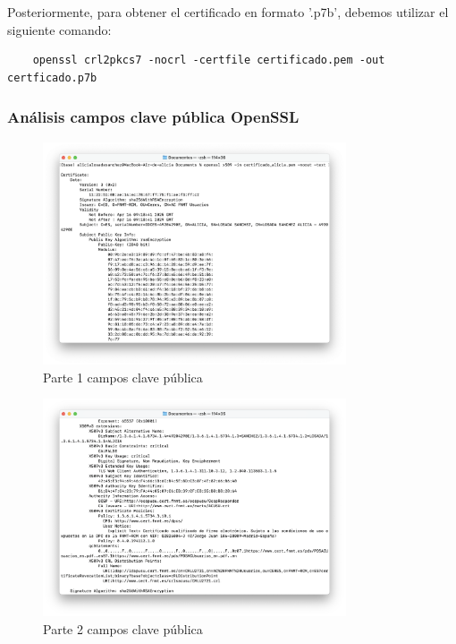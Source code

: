 Posteriormente, para obtener el certificado en formato '.p7b', debemos utilizar el siguiente comando:

\begin{verbatim}
    openssl crl2pkcs7 -nocrl -certfile certificado.pem -out certficado.p7b
\end{verbatim}

\subsubsection{Análisis campos clave pública OpenSSL}

\begin{figure}[H]   
    \centering
    \includegraphics[width=0.8\textwidth]{apartadoc_1.png}
    \caption{Parte 1 campos clave pública}
    \label{fig:apartadoc_1}
\end{figure}

\begin{figure}[H]   
    \centering
    \includegraphics[width=0.8\textwidth]{apartadoc_2.png}
    \caption{Parte 2 campos clave pública}
    \label{fig:apartadoc_2}
\end{figure}

